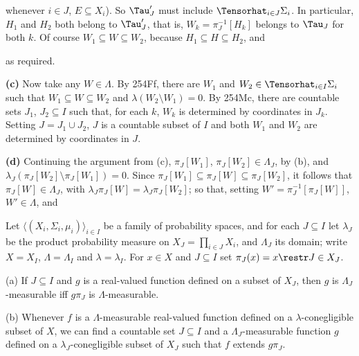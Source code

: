 {

\noindent whenever $i\in J$, $E\subseteq X_i$).   So $\Tau'_J$ must
include $\Tensorhat_{i\in J}\Sigma_i$.   In particular, $H_1$ and $H_2$
both belong to $\Tau'_J$, that is, $W_k=\pi_J^{-1}[H_k]$ belongs to
$\Tau_J$ for both $k$.   Of course $W_1\subseteq W\subseteq W_2$,
because $H_1\subseteq H\subseteq H_2$, and

\noindent as required.

\medskip

{\bf (c)} Now take any $W\in\Lambda$.   By
254Ff, there are $W_1$ and $W_2\in\Tensorhat_{i\in I}\Sigma_i$ such that
$W_1\subseteq W\subseteq W_2$ and $\lambda(W_2\setminus W_1)=0$.   By
254Mc, there are countable sets $J_1$, $J_2\subseteq I$ such that, for
each $k$, $W_k$ is determined by coordinates in $J_k$.   Setting
$J=J_1\cup J_2$, $J$ is a countable subset of $I$ and both $W_1$ and
$W_2$ are determined by coordinates in $J$.

\medskip

{\bf (d)} Continuing the argument from (c), $\pi_J[W_1]$,
$\pi_J[W_2]\in\Lambda_J$, by (b), and
$\lambda_J(\pi_J[W_2]\setminus\pi_J[W_1])=0$.   Since
$\pi_J[W_1]\subseteq\pi_J[W]\subseteq\pi_J[W_2]$, it follows that
$\pi_J[W]\in\Lambda_J$, with
$\lambda_J\pi_J[W]=\lambda_J\pi_J[W_2]$;  so that, setting
$W'=\pi_J^{-1}[\pi_J[W]]$, $W'\in\Lambda$, and

}%

 Let
$\langle(X_i,\Sigma_i,\mu_i)\rangle_{i\in I}$
be a family of probability spaces, and for each $J\subseteq I$ let
$\lambda_J$ be the product probability measure on
$X_J=\prod_{i\in J}X_i$, and $\Lambda_J$ its domain;  write $X=X_I$,
$\Lambda=\Lambda_I$ and $\lambda=\lambda_I$.   For $x\in X$ and
$J\subseteq I$ set $\pi_J(x)=x\restr J\in X_J$.

(a) If $J\subseteq I$ and $g$ is a real-valued function defined on a
subset of $X_J$, then $g$ is $\Lambda_J$-measurable iff $g\pi_J$ is
$\Lambda$-measurable.

(b) Whenever $f$ is a $\Lambda$-measurable real-valued function defined
on a $\lambda$-conegligible subset of $X$, we can find a countable set
$J\subseteq I$ and a $\Lambda_J$-measurable function $g$ defined on a
$\lambda_J$-conegligible subset of $X_J$ such that $f$ extends $g\pi_J$.

